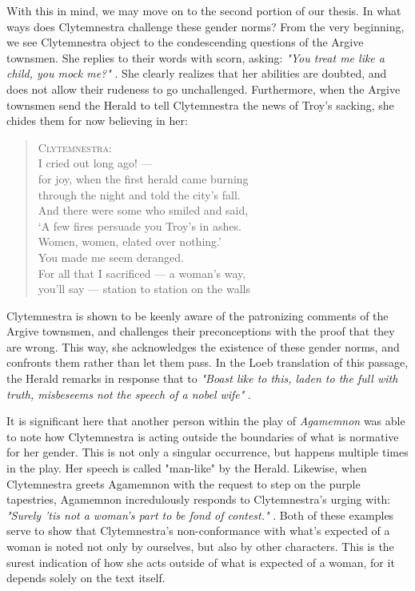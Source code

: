 With this in mind, we may move on to the second portion of our thesis. In what
ways does Clytemnestra challenge these gender norms? From the very beginning,
we see Clytemnestra object to the condescending questions of the Argive
townsmen. She replies to their words with scorn, asking: \emph{"You treat me
like a child, you mock me?"} \autocite[275]{fagles}. She clearly realizes that
her abilities are doubted, and does not allow their rudeness to go
unchallenged. Furthermore, when the Argive townsmen send the Herald to tell
Clytemnestra the news of Troy's sacking, she chides them for now believing in
her:

\begin{quote}
  \textsc{Clytemnestra}: \\
  I cried out long ago! --- \\
  for joy, when the first herald came burning \\
  through the night and told the city's fall. \\
  And there were some who smiled and said, \\
  `A few fires persuade you Troy's in ashes. \\
  Women, women, elated over nothing.' \\
  You made me seem deranged. \\
  For all that I sacrificed --- a woman's way, \\
  you'll say --- station to station on the walls

  \autocite[580]{fagles}
\end{quote}

\noindent
Clytemnestra is shown to be keenly aware of the
patronizing comments of the Argive townsmen, and challenges their preconceptions
with the proof that they are wrong. This way, she acknowledges the existence of
these gender norms, and confronts them rather than let them pass. In the Loeb
translation of this passage, the Herald remarks in response that to \emph{"Boast
like to this, laden to the full with truth, misbeseems not the speech of a
nobel wife"} \autocite[613]{loeb}.

\noindent
It is significant here that another person within the play of \emph{Agamemnon}
was able to note how Clytemnestra is acting outside the boundaries of what is
normative for her gender. This is not only a singular occurrence, but happens
multiple times in the play. Her speech is called "man-like" by the Herald.
Likewise, when Clytemnestra greets Agamemnon with the request to step on the
purple tapestries, Agamemnon incredulously responds to Clytemnestra's urging
with: \emph{"Surely 'tis not a woman's part to be fond of contest."}
\autocite[940]{loeb}. Both of these examples serve to show that Clytemnestra's
non-conformance with what's expected of a woman is noted not only by ourselves,
but also by other characters. This is the surest indication of how she acts
outside of what is expected of a woman, for it depends solely on the text
itself.

